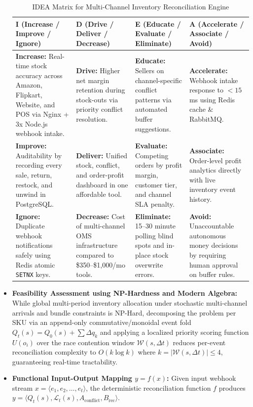 \documentclass[oneside,a4paper,12pt]{report}
\begin{document}
\begin{appendices}
\begin{itemize}
\begin{table}[!htbp]
\begin{center}
\renewcommand{\arraystretch}{1.4}
\begin{tabularx}{\textwidth}{|X|X|X|X|}
\hline
\textbf{I (Increase / Improve / Ignore)} & \textbf{D (Drive / Deliver / Decrease)} & \textbf{E (Educate / Evaluate / Eliminate)} & \textbf{A (Accelerate / Associate / Avoid)} \\ \hline
\textbf{Increase:} Real-time stock accuracy across Amazon, Flipkart, Website, and POS via Nginx + 3x Node.js webhook intake. & \textbf{Drive:} Higher net margin retention during stock-outs via priority conflict resolution. & \textbf{Educate:} Sellers on channel-specific conflict patterns via automated buffer suggestions. & \textbf{Accelerate:} Webhook intake response to $<15$ ms using Redis cache \& RabbitMQ. \\ \hline
\textbf{Improve:} Auditability by recording every sale, return, restock, and unwind in PostgreSQL. & \textbf{Deliver:} Unified stock, conflict, and order-profit dashboard in one affordable tool. & \textbf{Evaluate:} Competing orders by profit margin, customer tier, and channel SLA penalty. & \textbf{Associate:} Order-level profit analytics directly with live inventory event history. \\ \hline
\textbf{Ignore:} Duplicate webhook notifications safely using Redis atomic \texttt{SETNX} keys. & \textbf{Decrease:} Cost of multi-channel OMS infrastructure compared to \$350--\$1,000/mo tools. & \textbf{Eliminate:} 15--30 minute polling blind spots and in-place stock overwrite errors. & \textbf{Avoid:} Unaccountable autonomous money decisions by requiring human approval on buffer rules. \\ \hline
\end{tabularx}
\caption{IDEA Matrix for Multi-Channel Inventory Reconciliation Engine}
\label{tab:imatrix}
\end{center}
\end{table}

  \item \textbf{Feasibility Assessment using NP-Hardness and Modern Algebra:}
  While global multi-period inventory allocation under stochastic multi-channel arrivals and bundle constraints is NP-Hard, decomposing the problem per SKU via an append-only commutative/monoidal event fold $Q_t(s) = Q_0(s) + \sum \Delta q_k$ and applying a localized priority scoring function $U(o_i)$ over the race contention window $\mathcal{W}(s, \Delta t)$ reduces per-event reconciliation complexity to $O(k \log k)$ where $k = |\mathcal{W}(s, \Delta t)| \le 4$, guaranteeing real-time tractability.
  \item \textbf{Functional Input-Output Mapping $y = f(x)$:}
  Given input webhook stream $x = \langle e_1, e_2, \dots, e_t \rangle$, the deterministic reconciliation function $f$ produces $y = \langle Q_t(s), \mathcal{L}_t(s), A_{\text{conflict}}, B_{\text{rec}} \rangle$.
\end{itemize}


\end{appendices}
\end{document}
